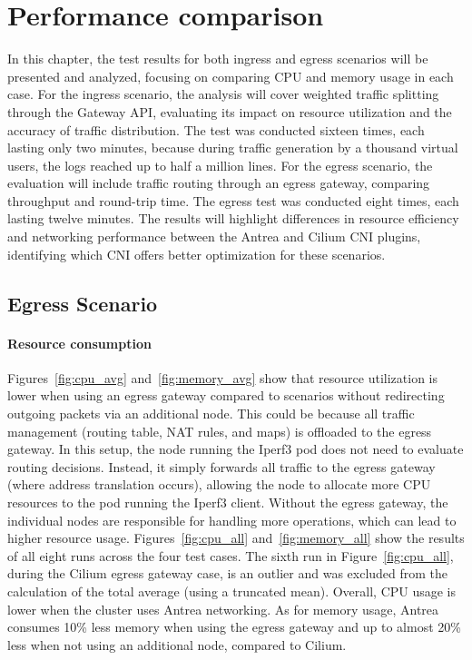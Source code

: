 \chapter{Performance comparison}
\label{cha:performCompare}

In this chapter, the test results for both ingress and egress scenarios will be presented and analyzed, focusing on comparing CPU and memory usage in each case. For the ingress scenario, the analysis will cover weighted traffic splitting through the Gateway API, evaluating its impact on resource utilization and the accuracy of traffic distribution. The test was conducted sixteen times, each lasting only two minutes, because during traffic generation by a thousand virtual users, the logs reached up to half a million lines. For the egress scenario, the evaluation will include traffic routing through an egress gateway, comparing throughput and round-trip time. The egress test was conducted eight times, each lasting twelve minutes. The results will highlight differences in resource efficiency and networking performance between the Antrea and Cilium CNI plugins, identifying which CNI offers better optimization for these scenarios.


\section{Egress Scenario}
\label{sec:egressComparison}

\subsubsection{Resource consumption}
\label{sec:egressResoureComsumption}



Figures~\ref{fig:cpu_avg} and~\ref{fig:memory_avg} show that resource utilization is lower when using an egress gateway compared to scenarios without redirecting outgoing packets via an additional node. This could be because all traffic management (routing table, NAT rules, and maps) is offloaded to the egress gateway. In this setup, the node running the Iperf3 pod does not need to evaluate routing decisions. Instead, it simply forwards all traffic to the egress gateway (where address translation occurs), allowing the node to allocate more CPU resources to the pod running the Iperf3 client. Without the egress gateway, the individual nodes are responsible for handling more operations, which can lead to higher resource usage. Figures~\ref{fig:cpu_all} and~\ref{fig:memory_all} show the results of all eight runs across the four test cases. The sixth run in Figure~\ref{fig:cpu_all}, during the Cilium egress gateway case, is an outlier and was excluded from the calculation of the total average (using a truncated mean). Overall, CPU usage is lower when the cluster uses Antrea networking. As for memory usage, Antrea consumes 10\% less memory when using the egress gateway and up to almost 20\% less when not using an additional node, compared to Cilium.

